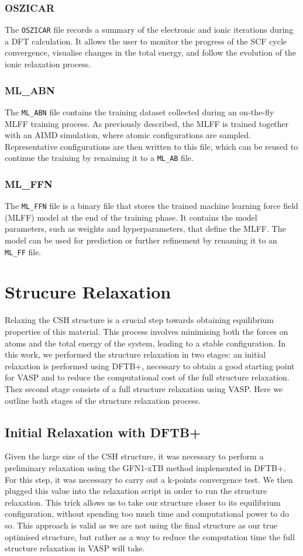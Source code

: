 \subsubsection{OSZICAR}
The \texttt{OSZICAR} file records a summary of the electronic and ionic iterations during a DFT calculation. It allows the user to monitor the progress of the SCF cycle convergence, visualise changes in the total energy, and follow the evolution of the ionic relaxation process. 
\subsubsection{ML\_ABN}
The \texttt{ML\_ABN} file contains the training dataset collected during an on-the-fly MLFF training process. As previously described, the MLFF is trained together with an AIMD simulation, where atomic configurations are sampled. Representative configurations are then written to this file, which can be reused to continue the training by renaiming it to a \texttt{ML\_AB} file.

\subsubsection{ML\_FFN}
The \texttt{ML\_FFN} file is a binary file that stores the trained machine learning force field (MLFF) model at the end of the training phase. It contains the model parameters, such as weights and hyperparameters, that define the MLFF. The model can be used for prediction or further refinement by renaming it to an \texttt{ML\_FF} file.


\section{Strucure Relaxation}
Relaxing the CSH structure is a crucial step towards obtaining equilibrium properties of this material. This process involves minimising both the forces on atoms and the total energy of the system, leading to a stable configuration. In this work, we performed the structure relaxation in two stages: an initial relaxation is performed using DFTB+, necessary to obtain a good starting point for VASP and to reduce the computational cost of the full structure relaxation. Thez second stage consists of a full structure relaxation using VASP. Here we outline both stages of the structure relaxation process.

\subsection{Initial Relaxation with DFTB+}
Given the large size of the CSH structure, it was necessary to perform a preliminary relaxation using the GFN1-xTB method implemented in DFTB+. For this step, it was necessary to carry out a k-points convergence test. We then plugged this value into the relaxation script in order to run the structure relaxation. This trick allows us to take our structure closer to its equilibrium configuration, without spending too much time and computational power to do so. This approach is valid as we are not using the final structure as our true optimised structure, but rather as a way to reduce the computation time the full structure relaxation in VASP will take.  


